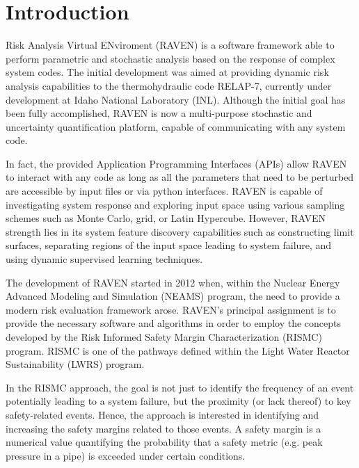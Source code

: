 \section{Introduction}

Risk Analysis Virtual ENviroment (RAVEN) is a software framework able to perform parametric and stochastic
analysis based on the response of complex system codes.
%
The initial development was aimed at providing dynamic risk analysis
capabilities to the thermohydraulic code RELAP-7, currently under development
at Idaho National Laboratory (INL).
%
Although the initial goal has been fully accomplished, RAVEN is now a
multi-purpose stochastic and uncertainty quantification platform, capable of communicating with any system code.

In fact, the provided Application Programming
Interfaces (APIs) allow RAVEN to interact with any code as long as all the parameters
that need to be perturbed are accessible by input files or via python
interfaces.
%
RAVEN is capable of investigating system response and exploring input space using various
sampling schemes such as Monte Carlo, grid, or Latin Hypercube.
%
However, RAVEN strength lies in its system feature discovery capabilities such as constructing
limit surfaces, separating regions of the input space leading to system failure,
and using dynamic supervised learning techniques.

The development of RAVEN started in 2012 when, within the Nuclear Energy
Advanced Modeling and Simulation (NEAMS) program, the need to provide a modern
risk evaluation framework arose.
%
RAVEN's principal assignment is to provide the necessary software and algorithms
in order to employ the concepts developed by the Risk Informed Safety Margin
Characterization (RISMC) program.
%
RISMC is one of the pathways defined within the Light Water Reactor
Sustainability (LWRS) program.

In the RISMC approach, the goal is not just to identify the frequency of an
event potentially leading to a system failure, but the proximity (or lack
thereof) to key safety-related events.
%
Hence, the approach is interested in identifying and increasing the safety
margins related to those events.
%
A safety margin is a numerical value quantifying the probability that a safety
metric (e.g. peak pressure in a pipe) is exceeded under certain conditions.

